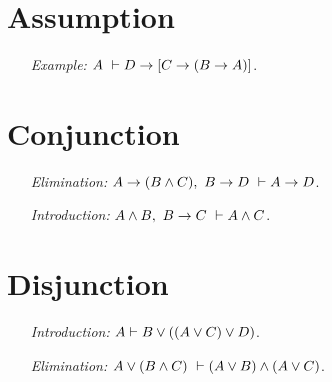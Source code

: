 \documentclass[a4paper, 11pt]{article} %
\begin{document}
\section*{Assumption}

\begin{enumerate}
  \item[\it Example:] $A\ \vdash D \rightarrow [C \rightarrow (B \rightarrow A)]$.
\end{enumerate}




\section*{Conjunction}

\begin{enumerate}
  \item[\it Elimination:] $A \rightarrow (B\wedge C),\ B \rightarrow D\ \vdash A \rightarrow D$.
  \item[\it Introduction:] $A \wedge B,\ B \rightarrow C\ \vdash A \wedge C$.
\end{enumerate}



\section*{Disjunction}

\begin{enumerate}
  \item[\it Introduction:] $A \vdash B \vee ((A \vee C) \vee D)$.
  \item[\it Elimination:] $A\vee(B\wedge C)\ \vdash (A \vee B) \wedge (A \vee C)$. 
\end{enumerate}
\end{document}
